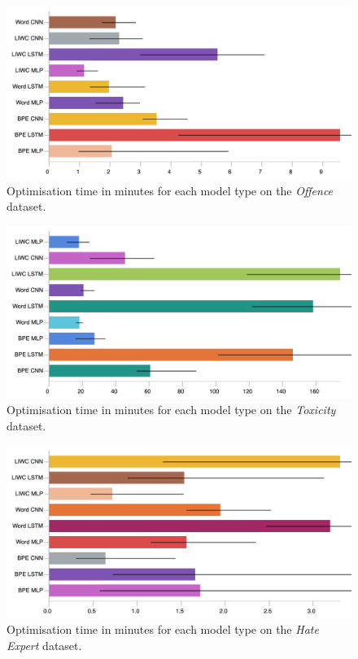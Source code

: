 \begin{figure}[h]  
    \centering  
    \includegraphics[width=\textwidth]{davidson_train_time.pdf}  
    \caption{Optimisation time in minutes for each model type on the \textit{Offence} dataset.}  
    \label{fig:davidson_train_time}  
\end{figure}  
\begin{figure}[h]  
    \centering  
    \includegraphics[width=\textwidth]{wulczyn_train_time.pdf}  
    \caption{Optimisation time in minutes for each model type on the \textit{Toxicity} dataset.}  
    \label{fig:wulczyn_train_time}  
\end{figure}  
\begin{figure}[h]  
    \centering  
    \includegraphics[width=\textwidth]{waseem_train_time.pdf}  
    \caption{Optimisation time in minutes for each model type on the \textit{Hate Expert} dataset.}  
    \label{fig:waseem_train_time}  
\end{figure}  
